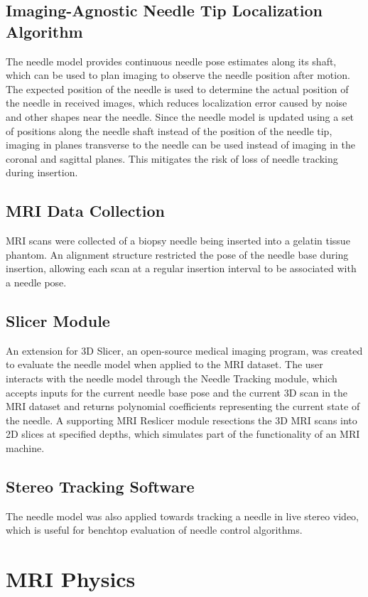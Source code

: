 \subsection{Imaging-Agnostic Needle Tip Localization Algorithm}
The needle model provides continuous needle pose estimates along its shaft, which can be used to plan imaging to observe the needle position after motion. The expected position of the needle is used to determine the actual position of the needle in received images, which reduces localization error caused by noise and other shapes near the needle. Since the needle model is updated using a set of positions along the needle shaft instead of the position of the needle tip, imaging in planes transverse to the needle can be used instead of imaging in the coronal and sagittal planes. This mitigates the risk of loss of needle tracking during insertion.

\subsection{MRI Data Collection}
MRI scans were collected of a biopsy needle being inserted into a gelatin tissue phantom. An alignment structure restricted the pose of the needle base during insertion, allowing each scan at a regular insertion interval to be associated with a needle pose.

\subsection{Slicer Module}
An extension for 3D Slicer, an open-source medical imaging program, was created to evaluate the needle model when applied to the MRI dataset. The user interacts with the needle model through the Needle Tracking module, which accepts inputs for the current needle base pose and the current 3D scan in the MRI dataset and returns polynomial coefficients representing the current state of the needle. A supporting MRI Reslicer module resections the 3D MRI scans into 2D slices at specified depths, which simulates part of the functionality of an MRI machine.

\subsection{Stereo Tracking Software}
The needle model was also applied towards tracking a needle in live stereo video, which is useful for benchtop evaluation of needle control algorithms.


\section{MRI Physics}

